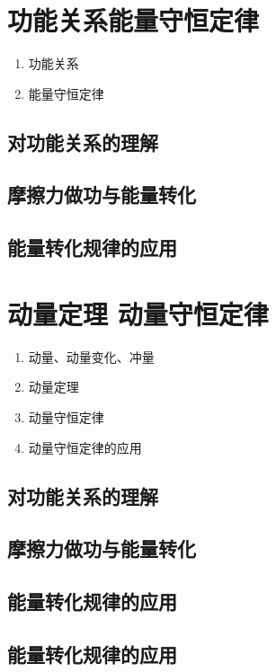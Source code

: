 \documentclass[cn,11pt]{elegantbook}
\begin{document}
\chapter{功能关系能量守恒定律}
\begin{enumerate}
   \item 功能关系
   \item 能量守恒定律
\end{enumerate}

\clearpage\section{对功能关系的理解}

\clearpage\section{摩擦力做功与能量转化}

\clearpage\section{能量转化规律的应用}


\chapter{动量定理 动量守恒定律}
\begin{enumerate}
   \item 动量、动量变化、冲量
   \item 动量定理
   \item 动量守恒定律
   \item 动量守恒定律的应用
\end{enumerate}

\clearpage\section{对功能关系的理解}

\clearpage\section{摩擦力做功与能量转化}

\clearpage\section{能量转化规律的应用}

\clearpage\section{能量转化规律的应用}
\end{document}
